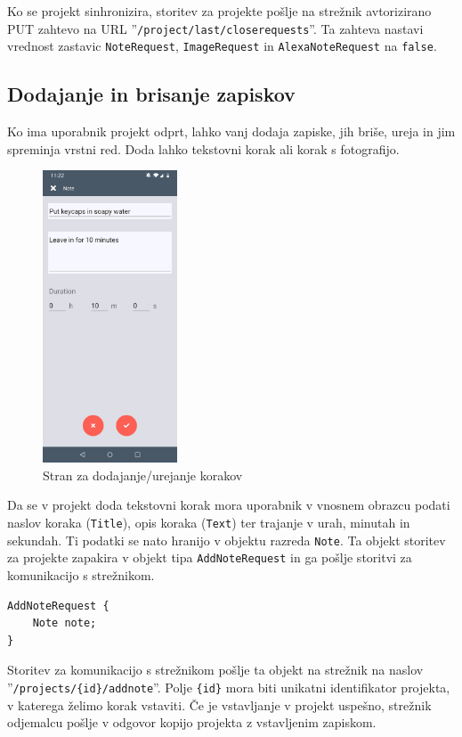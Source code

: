 \documentclass[a4paper, 12pt]{book}
\begin{document}
Ko se projekt sinhronizira, storitev za projekte pošlje na strežnik avtorizirano PUT zahtevo na URL ''\texttt{/project/last/closerequests}''.
Ta zahteva nastavi vrednost zastavic \texttt{NoteRequest}, \texttt{ImageRequest} in \texttt{AlexaNoteRequest} na \texttt{false}.


\subsection{Dodajanje in brisanje zapiskov}

Ko ima uporabnik projekt odprt, lahko vanj dodaja zapiske, jih briše, ureja in jim spreminja vrstni red.
Doda lahko tekstovni korak ali korak s fotografijo.

\begin{figure}[H]
\begin{center}
	\includegraphics[width=4cm]{app_note}
\end{center}
	\caption{Stran za dodajanje/urejanje korakov}
\label{app_note}
\end{figure}

Da se v projekt doda tekstovni korak mora uporabnik v vnosnem obrazcu podati naslov koraka (\texttt{Title}), opis koraka (\texttt{Text}) ter trajanje v urah, minutah in sekundah.
Ti podatki se nato hranijo v objektu razreda \texttt{Note}.
Ta objekt storitev za projekte zapakira v objekt tipa \texttt{AddNoteRequest} in ga pošlje storitvi za komunikacijo s strežnikom.

\begin{Verbatim}[commandchars=+\[\]]
AddNoteRequest { 
    Note note; 
}
\end{Verbatim}

Storitev za komunikacijo s strežnikom pošlje ta objekt na strežnik na naslov ''\texttt{/projects/\{id\}/addnote}''.
Polje \texttt{\{id\}} mora biti unikatni identifikator projekta, v katerega želimo korak vstaviti.
Če je vstavljanje v projekt uspešno, strežnik odjemalcu pošlje v odgovor kopijo projekta z vstavljenim zapiskom.
\end{document}
